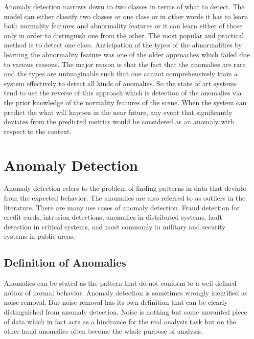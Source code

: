 \documentclass[a4paper,12pt]{report}
\begin{document}
Anomaly detection narrows down to two classes in terms of what to detect. The model can either classify two classes or one class or in other words it has to learn both normality features and abnormality features or it can learn either of those only in order to distinguish one from the other. The most popular and practical method is to detect one class.  Anticipation of the types of the abnormalities by learning the abnormality feature was one of the older approaches which failed due to various reasons. The major reason is that the fact that the anomalies are rare and the types are unimaginable such that one cannot comprehensively train a system effectively to detect all kinds of anomalies.  So the state of art systems tend to use the reverse of this approach which is detection of the anomalies via the prior knowledge of the normality features of the scene. When the system can predict the what will happen in the near future, any event that significantly deviates from the predicted metrics would be considered as an anomaly with respect to the context.

\section{Anomaly Detection}
Anomaly detection refers to the problem of finding patterns in data that deviate from the expected behavior. The anomalies are also referred to as outliers in the literature. There are many use cases of anomaly detection. Fraud detection for credit cards, intrusion detections, anomalies in distributed systems, fault detection in critical systems, and most commonly in military and security systems in public areas. 

\subsection{Definition of Anomalies}
Anomalies can be stated as the pattern that do not conform to a well-defined notion of normal behavior. Anomaly detection is sometimes wrongly identified as noise removal. But noise removal has its own definition that can be clearly distinguished from anomaly detection. Noise is nothing but some unwanted piece of data which in fact acts as a hindrance for the real analysis task but on the other hand anomalies often become the whole purpose of analysis.
\end{document}
